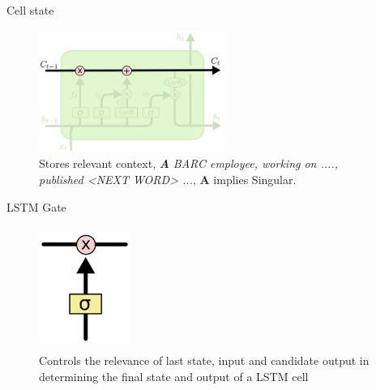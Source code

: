 \documentclass{beamer}
\begin{document}
\begin{frame}{Cell state}
    \begin{center}
       \begin{figure}
           \centering
            \includegraphics[width=6cm, height=4cm]{images/lstm_carry_over_colah.png}    
        \caption{Stores relevant context,  \textit{\textbf{A} BARC employee, working on ...., published \big<NEXT WORD\big> ...}, \textbf{A} implies Singular.}
        \end{figure}
    \end{center}
\end{frame}

\begin{frame}{LSTM Gate}
    \begin{center}
        \begin{figure}
            \centering
                \includegraphics[width=3cm, height=4cm]{images/lstm_gate_colah.png}    
                \caption{Controls the relevance of last state, input and candidate output in determining the final state and output of a LSTM cell}
        \end{figure}       
    \end{center}
\end{frame}
\end{document}
